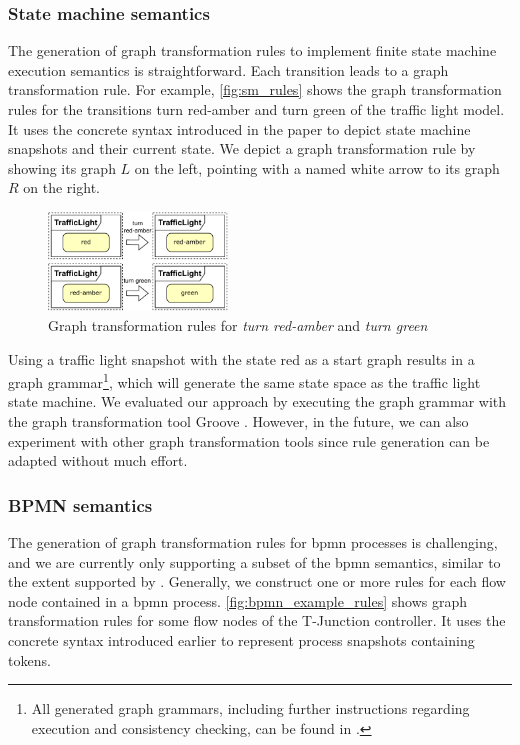 \documentclass{jot}
\begin{document}
\subsubsection{State machine semantics}
The generation of graph transformation rules to implement finite state machine execution semantics is straightforward.
Each transition leads to a graph transformation rule.
For example, \autoref{fig:sm_rules} shows the graph transformation rules for the transitions \textsf{turn red-amber} and \textsf{turn green} of the traffic light model.
It uses the concrete syntax introduced in the paper to depict state machine snapshots and their current state.
We depict a graph transformation rule by showing its graph $L$ on the left, pointing with a named white arrow to its graph $R$ on the right.

\begin{figure}[h]
    \centering
    \includegraphics[width=0.425\textwidth]{figures/sm_rules.pdf}
    \caption{Graph transformation rules for \emph{turn red-amber} and \emph{turn green}}
    \label{fig:sm_rules}
\end{figure}

Using a traffic light snapshot with the state red as a start graph results in a graph grammar\footnote{\label{footnote:GGinRepo}All generated graph grammars, including further instructions regarding execution and consistency checking, can be found in \cite{krauterArtifactsBehavioralConsistency2022}.}, which will generate the same state space as the traffic light state machine.
We evaluated our approach by executing the graph grammar with the graph transformation tool Groove \cite{ghamarianModellingAnalysisUsing2012, rensinkGROOVESimulatorTool2004}.
However, in the future, we can also experiment with other graph transformation tools since rule generation can be adapted without much effort.

\subsubsection{BPMN semantics}
The generation of graph transformation rules for \gls*{bpmn} processes is challenging, and we are currently only supporting a subset of the \gls*{bpmn} semantics, similar to the extent supported by \cite{vangorpVisualTokenbasedFormalization2013}.
Generally, we construct one or more rules for each flow node contained in a \gls*{bpmn} process.
\autoref{fig:bpmn_example_rules} shows graph transformation rules for some flow nodes of the T-Junction controller.
It uses the concrete syntax introduced earlier to represent process snapshots containing tokens.
\end{document}
